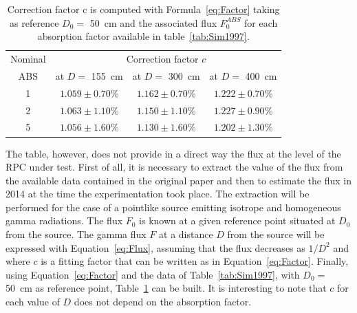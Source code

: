 \newpage
	
\begingroup\setlength{\intextsep}{5pt}\setlength{\columnsep}{15pt}
	
	\begin{table}
		\centering
		\begin{tabular}{|*{4}{c|}}
			\hline
			Nominal & \multicolumn{3}{c|}{Correction factor $c$}                         \\
			ABS     & at $D=$ \SI{155}{cm} & at $D=$ \SI{300}{cm} & at $D=$ \SI{400}{cm} \\
			\hline
			1       & $1.059 \pm 0.70\%$   & $1.162 \pm 0.70\%$   & $1.222 \pm 0.70\%$   \\
			\hline
			2       & $1.063 \pm 1.10\%$   & $1.150 \pm 1.10\%$   & $1.227 \pm 0.90\%$   \\
			\hline
			5       & $1.056 \pm 1.60\%$   & $1.130 \pm 1.60\%$   & $1.202 \pm 1.30\%$   \\
			\hline
		\end{tabular}
		\caption{\label{tab:CorrFactor} Correction factor c is computed with Formula~\ref{eq:Factor} taking as reference $D_0 =$ \SI{50}{cm} and the associated flux $F_0^{ABS}$ for each absorption factor available in table~\ref{tab:Sim1997}.}
	\end{table}
	
	The table, however, does not provide in a direct way the flux at the level of the RPC under test. First of all, it is necessary to extract the value of the flux from the available data contained in the original paper and then to estimate the flux in 2014 at the time the experimentation took place. The extraction will be performed for the case of a pointlike source emitting isotrope and homogeneous gamma radiations. The flux $F_0$ is known at a given reference point situated at $D_0$ from the source. The gamma flux $F$ at a distance $D$ from the source will be expressed with Equation~\ref{eq:Flux}, assuming that the flux decreases as $1/D^2$ and where $c$ is a fitting factor that can be written as in Equation~\ref{eq:Factor}. Finally, using Equation~\ref{eq:Factor} and the data of Table~\ref{tab:Sim1997}, with $D_0=$ \SI{50}{cm} as reference point, Table~\ref{tab:CorrFactor} can be built. It is interesting to note that $c$ for each value of $D$ does not depend on the absorption factor.

\endgroup
	
